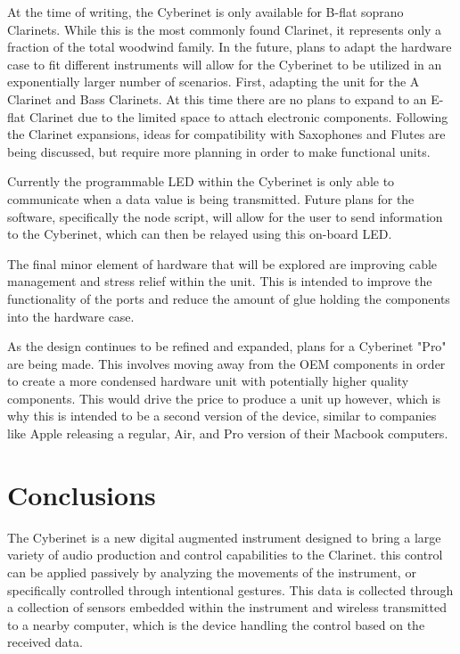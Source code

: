 At the time of writing, the Cyberinet is only available for B-flat soprano Clarinets. While this is the most commonly found Clarinet, it represents only a fraction of the total woodwind family. In the future, plans to adapt the hardware case to fit different instruments will allow for the Cyberinet to be utilized in an exponentially larger number of scenarios. First, adapting the unit for the A Clarinet and Bass Clarinets. At this time there are no plans to expand to an E-flat Clarinet due to the limited space to attach electronic components. Following the Clarinet expansions, ideas for compatibility with Saxophones and Flutes are being discussed, but require more planning in order to make functional units.

Currently the programmable LED within the Cyberinet is only able to communicate when a data value is being transmitted. Future plans for the software, specifically the node script, will allow for the user to send information to the Cyberinet, which can then be relayed using this on-board LED.

The final minor element of hardware that will be explored are improving cable management and stress relief within the unit. This is intended to improve the functionality of the ports and reduce the amount of glue holding the components into the hardware case. 

As the design continues to be refined and expanded, plans for a Cyberinet "Pro" are being made. This involves moving away from the OEM components in order to create a more condensed hardware unit with potentially higher quality components. This would drive the price to produce a unit up however, which is why this is intended to be a second version of the device, similar to companies like Apple releasing a regular, Air, and Pro version of their Macbook computers.

\section{Conclusions}

The Cyberinet is a new digital augmented instrument designed to bring a large variety of audio production and control capabilities to the Clarinet. this control can be applied passively by analyzing the movements of the instrument, or specifically controlled through intentional gestures. This data is collected through a collection of sensors embedded within the instrument and wireless transmitted to a nearby computer, which is the device handling the control based on the received data.

